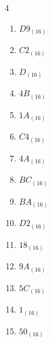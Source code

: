 \begin{multicols}{4}
\begin{enumerate}
        \phantom{$=71$}

  \item $D9_{(16)}$

        \phantom{$=217$}

  \item $C2_{(16)}$

        \phantom{$=194$}

  \item $D_{(16)}$

        \phantom{$=13$}

  \item $4B_{(16)}$

        \phantom{$=75$}

  \item $1A_{(16)}$

        \phantom{$=26$}

  \item $C4_{(16)}$

        \phantom{$=196$}

  \item $4A_{(16)}$

        \phantom{$=74$}

  \item $BC_{(16)}$

        \phantom{$=188$}

  \item $BA_{(16)}$

        \phantom{$=186$}

  \item $D2_{(16)}$

        \phantom{$=210$}

\columnbreak %

  \item $18_{(16)}$

        \phantom{$=24$}

  \item $9A_{(16)}$

        \phantom{$=154$}

  \item $5C_{(16)}$

        \phantom{$=92$}

  \item $1_{(16)}$

        \phantom{$=1$}

  \item $50_{(16)}$

        \phantom{$=80$}


\end{enumerate}
\end{multicols}
